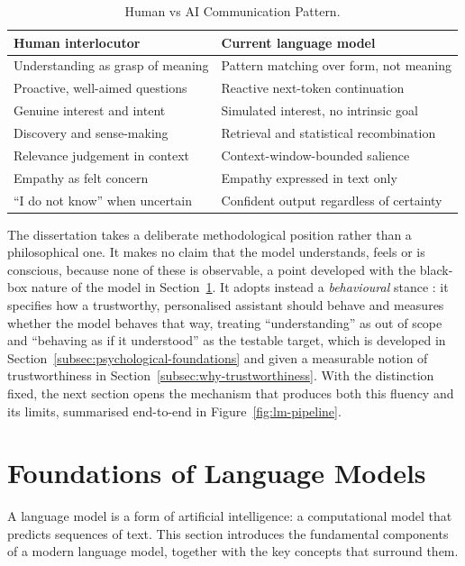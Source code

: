 \begin{table}[H]
  \centering
  \caption{Human vs AI Communication Pattern.}
  \label{tab:human-vs-ai}
  \begin{tabular}{ll}
    \hline
    Human interlocutor & Current language model \\
    \hline
    Understanding as grasp of meaning   & Pattern matching over form, not meaning \\
    Proactive, well-aimed questions     & Reactive next-token continuation \\
    Genuine interest and intent         & Simulated interest, no intrinsic goal \\
    Discovery and sense-making          & Retrieval and statistical recombination \\
    Relevance judgement in context      & Context-window-bounded salience \\
    Empathy as felt concern             & Empathy expressed in text only \\
    ``I do not know'' when uncertain    & Confident output regardless of certainty \\
    \hline
  \end{tabular}
\end{table}

The dissertation takes a deliberate methodological position rather than a philosophical one. It makes no claim that the model understands, feels or is conscious, because none of these is observable, a point developed with the black-box nature of the model in Section~\ref{sec:foundations}. It adopts instead a \emph{behavioural} stance \cite{skinner1953sciencehumanbehavior}: it specifies how a trustworthy, personalised assistant should behave and measures whether the model behaves that way, treating ``understanding'' as out of scope and ``behaving as if it understood'' as the testable target, which is developed in Section~\ref{subsec:psychological-foundations} and given a measurable notion of trustworthiness in Section~\ref{subsec:why-trustworthiness}. With the distinction fixed, the next section opens the mechanism that produces both this fluency and its limits, summarised end-to-end in Figure~\ref{fig:lm-pipeline}.

\section{Foundations of Language Models}
\label{sec:foundations}

A language model is a form of artificial intelligence: a computational model that predicts sequences of text. This section introduces the fundamental components of a modern language model, together with the key concepts that surround them.

